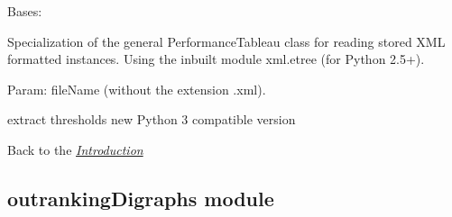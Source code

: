 \documentclass[letterpaper,10pt,english]{sphinxmanual}
\begin{document}

\begin{fulllineitems}
\label{techDoc:perfTabs.XMLRubisPerformanceTableau}
Bases: {\hyperref[techDoc:perfTabs.PerformanceTableau]{}}

Specialization of the general PerformanceTableau class for reading
stored XML formatted instances. Using the inbuilt module
xml.etree (for Python 2.5+).

Param: fileName (without the extension .xml).

\begin{fulllineitems}
\label{techDoc:perfTabs.XMLRubisPerformanceTableau.stripsplit}
extract thresholds new Python 3 compatible version

\end{fulllineitems}


\end{fulllineitems}


Back to the {\hyperref[techDoc:technical-label]{\emph{Introduction}}}


\subsection{outrankingDigraphs module}
\label{techDoc:outrankingdigraphs-label}\label{techDoc:module-outrankingDigraphs}\label{techDoc:outrankingdigraphs-module}
\end{document}
